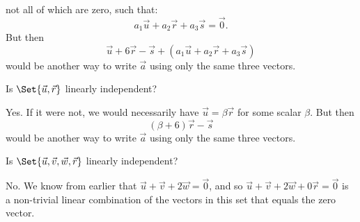 \documentclass{workbook}
\begin{document}
\begin{slide}
\begin{parts}[resume]
\begin{solution}
				not all of which are zero, such that:
				\[
					a_1 \vec u + a_2 \vec r + a_3\vec s = \vec 0.
				\]
				But then
				\[
					\vec u+6\vec r-\vec s + (a_1 \vec u + a_2 \vec r + a_3\vec s)
				\]
				would be another way to write $\vec a$ using only the same three
				vectors.
			\end{solution}
		\item Is $\Set{\vec u,\vec r}$ linearly independent?
			\begin{solution}
				Yes. If it were not, we would necessarily have $\vec u = \beta \vec r$
				for some scalar $\beta$. But then
				\[
					(\beta + 6) \vec r - \vec s
				\]
				would be another way to write $\vec a$ using only the same three
				vectors.
			\end{solution}
		\item Is $\Set{\vec u,\vec v,\vec w,\vec r}$ linearly independent?
			\begin{solution}
				No. We know from earlier that $\vec u+\vec v+2\vec w=\vec 0$, and
				so $\vec u+\vec v+2\vec w+0\vec r=\vec 0$ is a non-trivial linear
				combination of the vectors in this set that equals the zero vector.
			\end{solution}
	\end{parts}

\end{slide}
\end{document}
